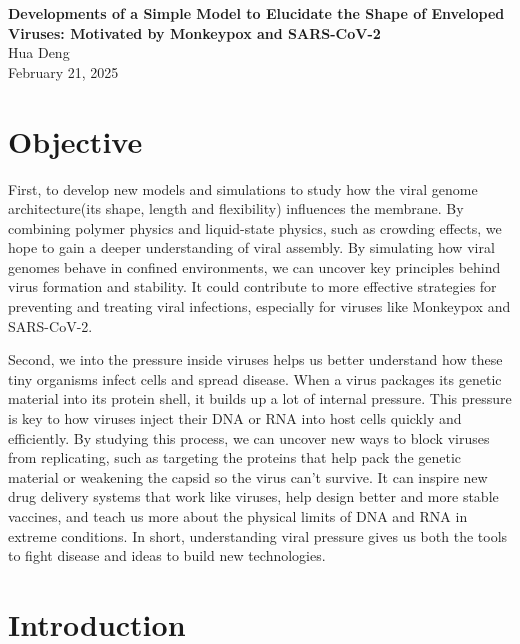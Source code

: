 \documentclass[12pt]{article}
\begin{document}
\doublespacing

\begin{center}
{\Large \textbf{Developments of a Simple Model to Elucidate the Shape of Enveloped Viruses: Motivated by Monkeypox and SARS-CoV-2}}\\[1.5ex]
{\normalsize  Hua Deng}\\

{\normalsize February 21, 2025}
\end{center}





\begin{flushleft}
\setlength{\parindent}{45pt}
\section*{Objective}
First, to develop new models and simulations to study how the viral genome architecture(its shape, length and flexibility) influences the membrane. By combining polymer physics and liquid-state physics, such as crowding effects, we hope to gain a deeper understanding of viral assembly. By simulating how viral genomes behave in confined environments, we can uncover key principles behind virus formation and stability. It could contribute to more effective strategies for preventing and treating viral infections, especially for viruses like Monkeypox and SARS-CoV-2.

Second, we into the pressure inside viruses helps us better understand how these tiny organisms infect cells and spread disease. When a virus packages its genetic material into its protein shell, it builds up a lot of internal pressure. This pressure is key to how viruses inject their DNA or RNA into host cells quickly and efficiently. By studying this process, we can uncover new ways to block viruses from replicating, such as targeting the proteins that help pack the genetic material or weakening the capsid so the virus can’t survive. It can inspire new drug delivery systems that work like viruses, help design better and more stable vaccines, and teach us more about the physical limits of DNA and RNA in extreme conditions. In short, understanding viral pressure gives us both the tools to fight disease and ideas to build new technologies.

\section*{Introduction}


\end{flushleft}
\end{document}
